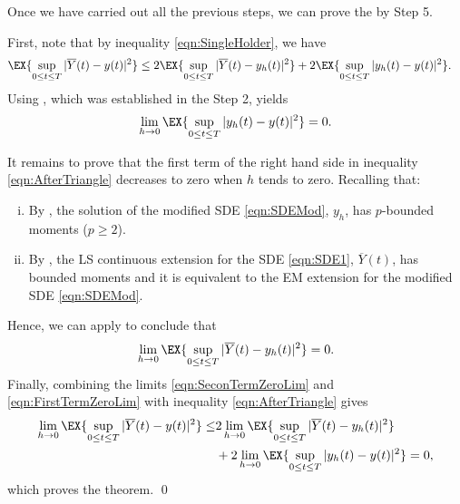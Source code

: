 \documentclass[3p]{elsarticle}
\theoremstyle{definition}
\theoremstyle{plain}%
\theoremstyle{remark}
\newcommand{\SM}{LS\xspace}
\begin{document}
	Once we have carried out all the previous steps, we can prove the  by Step 5.%
\begin{pf}
	First,  note that by inequality \eqref{eqn:SingleHolder}, we have
	\begin{align}\label{eqn:AfterTriangle}
		\EX{\sup_{0\leq t \leq T}|\overline{Y}(t) - y(t)|^2}
		&\leq
		2\EX{
			\sup_{0\leq t \leq T}
			|\overline{Y}(t) - y_h(t)|^2
		}
		+
		2\EX{
			\sup_{0\leq t \leq T}
			|y_h(t) - y(t)|^2
		}.
	\end{align}
	Using , which was established in the Step 2, yields
	\begin{equation}\label{eqn:SeconTermZeroLim}
		\lim_{h\to 0}
		\EX{
			\sup_{0\leq t \leq T}
			|y_h(t) - y(t)|^2
		} = 0.
	\end{equation}
	
		It remains to prove that the first term of the right hand side in inequality \eqref{eqn:AfterTriangle} 
		decreases to zero
	when $h$ tends to zero. Recalling that:
	\begin{enumerate}[i)]
		\item 
			By , the solution of the modified SDE \eqref{eqn:SDEMod}, $y_h$, has
			$p$-bounded moments ($p\geq 2$).
		\item
			By , the \SM continuous extension for the SDE \eqref{eqn:SDE1},
			$\overline{Y}(t)$, has bounded moments and it is equivalent to the EM extension for the modified SDE 
			\eqref{eqn:SDEMod}.
	\end{enumerate}
	Hence, we can apply 
	 to conclude that
\begin{equation}\label{eqn:FirstTermZeroLim}
	\lim_{h\to 0}
	\EX{
		\sup_{0\leq t \leq T}
		|\overline{Y}(t) - y_h(t)|^2
	} = 0.
\end{equation}
	Finally, combining the limits \eqref{eqn:SeconTermZeroLim} and \eqref{eqn:FirstTermZeroLim} with 
	inequality \eqref{eqn:AfterTriangle} gives
\begin{align*}
	\lim_{h \to 0}
	\EX{
		\sup_{0\leq t \leq T}
		|\overline{Y}(t) - y(t)|^2
	}
	\leq
	&
	2\lim_{h\to 0}
	\EX{
		\sup_{0\leq t \leq T}
		|\overline{Y}(t) - y_h(t)|^2
	}
	\\
	&
	+
	2\lim_{h\to 0}
	\EX{
		\sup_{0\leq t \leq T}
		|y_h(t) - y(t)|^2
	} = 0,
\end{align*}
which proves the theorem. \qed
\end{pf}
\end{document}
